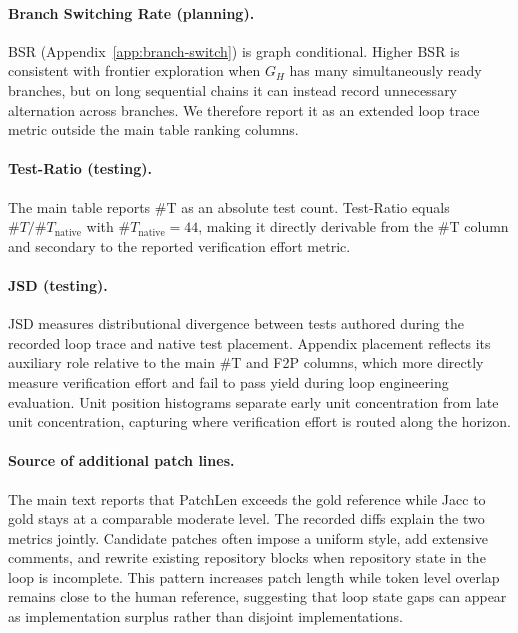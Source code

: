 \paragraph{Branch Switching Rate (planning).}
BSR (Appendix~\ref{app:branch-switch}) is graph conditional. Higher BSR is consistent with frontier exploration when $G_H$ has many simultaneously ready branches, but on long sequential chains it can instead record unnecessary alternation across branches. We therefore report it as an extended loop trace metric outside the main table ranking columns.

\paragraph{Test-Ratio (testing).}
The main table reports \#T as an absolute test count. Test-Ratio equals $\#T/\#T_{\text{native}}$ with $\#T_{\text{native}}=44$, making it directly derivable from the \#T column and secondary to the reported verification effort metric.

\paragraph{JSD (testing).}
JSD measures distributional divergence between tests authored during the recorded loop trace and native test placement. Appendix placement reflects its auxiliary role relative to the main \#T and F2P columns, which more directly measure verification effort and fail to pass yield during loop engineering evaluation. Unit position histograms separate early unit concentration from late unit concentration, capturing where verification effort is routed along the horizon.

\paragraph{Source of additional patch lines.}
The main text reports that PatchLen exceeds the gold reference while Jacc to gold stays at a comparable moderate level. The recorded diffs explain the two metrics jointly. Candidate patches often impose a uniform style, add extensive comments, and rewrite existing repository blocks when repository state in the loop is incomplete. This pattern increases patch length while token level overlap remains close to the human reference, suggesting that loop state gaps can appear as implementation surplus rather than disjoint implementations.
